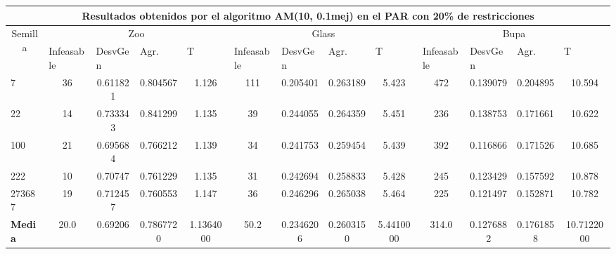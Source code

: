 \begin{table}[H]
	\tiny

	\begin{adjustwidth}{-1cm}{-1cm}%
	
	\begin{tabular}{|l|c|c|c|c|c|c|c|c|c|c|c|c|}
	\hline
	\multicolumn{13}{|c|}{\textbf{Resultados obtenidos por el algoritmo AM(10, 0.1mej) en el PAR con 20\% de restricciones}}                                                                                                                                                                                                                                                                                                                                            \\ \hline
	\multicolumn{1}{|c|}{\multirow{2}{*}{Semilla}} & \multicolumn{4}{c|}{Zoo}                                                                                          & \multicolumn{4}{c|}{Glass}                                                                                         & \multicolumn{4}{c|}{Bupa}                                                                                          \\ \cline{2-13} 
	\multicolumn{1}{|c|}{}                                  & \multicolumn{1}{l|}{Infeasable} & \multicolumn{1}{l|}{DesvGen} & \multicolumn{1}{l|}{Agr.} & \multicolumn{1}{l|}{T} & \multicolumn{1}{l|}{Infeasable} & \multicolumn{1}{l|}{DesvGen} & \multicolumn{1}{l|}{Agr.} & \multicolumn{1}{l|}{T} & \multicolumn{1}{l|}{Infeasable} & \multicolumn{1}{l|}{DesvGen} & \multicolumn{1}{l|}{Agr.} & \multicolumn{1}{l|}{T} \\ \hline
	7   	& 36 & 0.611821 & 0.804567 & 1.126 &				111 & 0.205401 & 0.263189 & 5.423 &			 	472 & 0.139079 & 0.204895 & 10.594		\\ \hline
	22 		& 14 & 0.733343 & 0.841299 & 1.135 &				39 & 0.244055 & 0.264359 & 5.451 &		 	236 & 0.138753 & 0.171661 & 10.622		\\ \hline
	100 	& 21 & 0.695684 & 0.766212 & 1.139 &				34 & 0.241753 & 0.259454 & 5.439 &				392 & 0.116866 & 0.171526 & 10.685		\\ \hline
	222 	& 10 & 0.70747 & 0.761229 & 1.135 &				 31 & 0.242694 & 0.258833 & 5.428 & 			245 & 0.123429 & 0.157592 & 10.878			\\ \hline
	273687 	& 19 & 0.712457 & 0.760553 & 1.147 &				36 & 0.246296 & 0.265038 & 5.464 &			225 & 0.121497 & 0.152871 & 10.782		\\ \hline
	\textbf{Media} & 20.0 & 	0.69206 & 	0.7867720 & 	1.1364000 & 	50.2 & 	0.2346206	 & 0.2603150	 & 5.4410000 & 	314.0	 & 0.1276882	 & 0.1761858 & 	10.7122000  \\ \hline
	\end{tabular}
	
	\end{adjustwidth}
	
\end{table}


